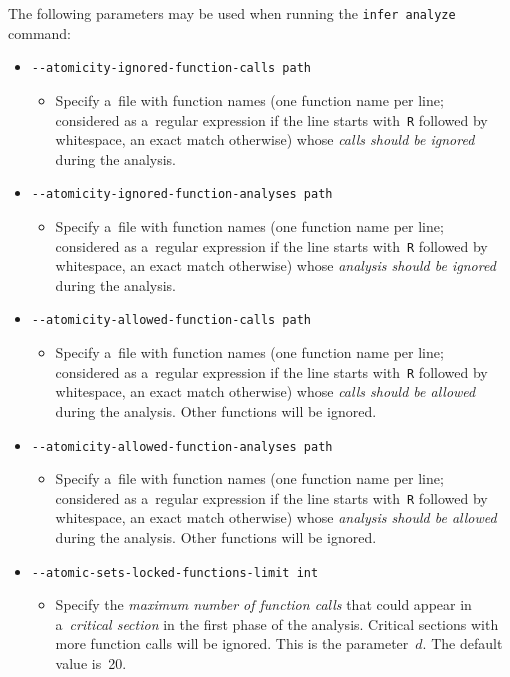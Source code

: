 The following parameters may be used when running the \texttt{infer analyze} command:
\begin{itemize}[label={}]
    \item \texttt{-{}-atomicity-ignored-function-calls path}
    \begin{itemize}
        \item Specify a~file with function names (one function name per line; considered as a~regular expression if the line starts with~\texttt{R} followed by whitespace, an exact match otherwise) whose \emph{calls should be ignored} during the analysis.
    \end{itemize}
    
    \item \texttt{-{}-atomicity-ignored-function-analyses path}
    \begin{itemize}
        \item Specify a~file with function names (one function name per line; considered as a~regular expression if the line starts with~\texttt{R} followed by whitespace, an exact match otherwise) whose \emph{analysis should be ignored} during the analysis.
    \end{itemize}
    
    \item \texttt{-{}-atomicity-allowed-function-calls path}
    \begin{itemize}
        \item Specify a~file with function names (one function name per line; considered as a~regular expression if the line starts with~\texttt{R} followed by whitespace, an exact match otherwise) whose \emph{calls should be allowed} during the analysis. Other functions will be ignored.
    \end{itemize}
    
    \item \texttt{-{}-atomicity-allowed-function-analyses path}
    \begin{itemize}
        \item Specify a~file with function names (one function name per line; considered as a~regular expression if the line starts with~\texttt{R} followed by whitespace, an exact match otherwise) whose \emph{analysis should be allowed} during the analysis. Other functions will be ignored.
    \end{itemize}
    
    \item \texttt{-{}-atomic-sets-locked-functions-limit int}
    \begin{itemize}
        \item Specify the \emph{maximum number of function calls} that could appear in a~\emph{critical section} in the first phase of the analysis. Critical sections with more function calls will be ignored. This is the parameter~$ d $. The default value is~20.
    \end{itemize}
    

\end{itemize}
